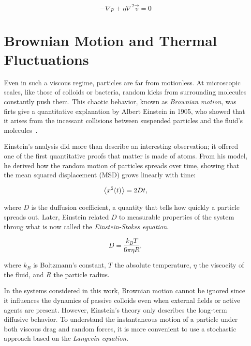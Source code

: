 \begin{equation}
  - \nabla p + \eta \nabla ^2 \vec{v} = 0
  \label{eq:Navier-Stokes}
\end{equation}



\section{Brownian Motion and Thermal Fluctuations}
\label{st:brownianmotion}
Even in such a viscous regime, particles are far from motionless. At microscopic scales, like those of colloids or bacteria, random kicks from surrounding molecules constantly push them. This chaotic behavior, known as \textit{Brownian motion}, was firts give a quantitative explanation by Albert Einstein in 1905, who showed that it arises from the incessant collisions between suspended particles and the fluid's molecules~\cite{einstein1906theory}.

Einstein’s analysis did more than describe an interesting observation; it offered one of the first quantitative proofs that matter is made of atoms. From his model, he derived how the random motion of particles spreads over time, showing that the mean squared displacement (MSD) grows linearly with time:

\begin{equation}
  \expval{x^2(t)} = 2Dt, 
  \label{eq:msd}
\end{equation}

where $D$ is the duffusion coefficient, a quantity that tells how quickly a particle spreads out. Later, Einstein related $D$ to measurable properties of the system throug what is now called the \textit{Einstein-Stokes equation}.

\begin{equation}
  D = \frac{k_BT}{6\pi \eta R},
  \label{eq:diffusioncoefficient}
\end{equation}

where $k_B$ is Boltzmann's constant, $T$ the absolute temperature, $\eta$ the viscocity of the fluid, and $R$ the particle radius.

In the systems considered in this work, Brownian motion cannot be ignored since it influences the dynamics of passive colloids even when external fields or active agents are present. However, Einstein’s theory only describes the long-term diffusive behavior. To understand the instantaneous motion of a particle under both viscous drag and random forces, it is more convenient to use a stochastic approach based on the \textit{Langevin equation}.

